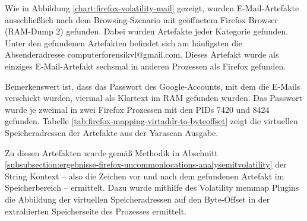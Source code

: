 Wie in Abbildung \ref{chart:firefox-volatility-mail} gezeigt, wurden E-Mail-Artefakte ausschließlich nach dem Browsing-Szenario mit geöffnetem Firefox Browser (RAM-Dump 2) gefunden. Dabei wurden Artefakte jeder Kategorie gefunden.
Unter den gefundenen Artefakten befindet sich am häufigsten die Absenderadresse \glqq{}computerforensikvl@gmail.com\grqq{}. Dieses Artefakt wurde als einziges E-Mail-Artefakt sechsmal in anderen Prozessen als Firefox gefunden.

Bemerkenswert ist, dass das Passwort des Google-Accounts, mit dem die E-Mails verschickt wurden, viermal als Klartext im RAM gefunden wurden. Das Passwort wurde je zweimal in zwei Firefox Prozessen mit den PIDs 7420 und 8424 gefunden. Tabelle \ref{tab:firefox-mapping-virtaddr-to-byteoffset} zeigt die virtuellen Speicheradressen der Artefakte aus der Yarascan Ausgabe.
\begin{table}[h!]
\caption{Firefox: Abbildung der virtellen Speicheradressen der gefundenen Strings auf Byte-Offsets der entsprechenden Speicherseiten}
\label{tab:firefox-mapping-virtaddr-to-byteoffset}
\end{table}

Zu diesen Artefakten wurde gemäß Methodik in Abschnitt \ref{subsubsection:ergebnisse-firefox-uncommonlocations-analysemitvolatility} der String Kontext -- also die Zeichen vor und nach dem gefundenen Artefakt im Speicherbereich -- ermittelt. Dazu wurde mithilfe des Volatility memmap Plugins die Abbildung der virtuellen Speicheradressen auf den Byte-Offset in der extrahierten Speicherseite des Prozesses ermittelt. 

